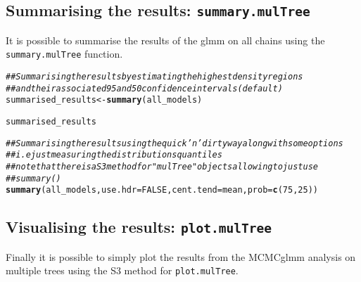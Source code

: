 \documentclass{article}\usepackage[]{graphicx}\usepackage[]{color}
\makeatletter
\newcommand{\hlnum}[1]{\textcolor[rgb]{0.686,0.059,0.569}{#1}}%
\newcommand{\hlcom}[1]{\textcolor[rgb]{0.678,0.584,0.686}{\textit{#1}}}%
\newcommand{\hlstd}[1]{\textcolor[rgb]{0.345,0.345,0.345}{#1}}%
\newcommand{\hlkwb}[1]{\textcolor[rgb]{0.69,0.353,0.396}{#1}}%
\newcommand{\hlkwc}[1]{\textcolor[rgb]{0.333,0.667,0.333}{#1}}%
\newcommand{\hlkwd}[1]{\textcolor[rgb]{0.737,0.353,0.396}{\textbf{#1}}}%
\newenvironment{kframe}{%
 \def\at@end@of@kframe{}%
 \ifinner\ifhmode%
  \def\at@end@of@kframe{\end{minipage}}%
  \begin{minipage}{\columnwidth}%
 \fi\fi%
 \def\FrameCommand##1{\hskip\@totalleftmargin \hskip-\fboxsep
 \colorbox{shadecolor}{##1}\hskip-\fboxsep
     \hskip-\linewidth \hskip-\@totalleftmargin \hskip\columnwidth}%
 \MakeFramed {\advance\hsize-\width
   \@totalleftmargin\z@ \linewidth\hsize
   \@setminipage}}%
 {\par\unskip\endMakeFramed%
 \at@end@of@kframe}
\newenvironment{knitrout}{}{} %
\makeatother
\begin{document}
\subsection{Summarising the results: \texttt{summary.mulTree}}
It is possible to summarise the results of the glmm on all chains using the \texttt{summary.mulTree} function.

\begin{knitrout}
\color{fgcolor}\begin{kframe}
\begin{alltt}
\hlcom{## Summarising the results by estimating the highest density regions}
\hlcom{## and their associated 95 and 50 confidence intervals (default)}
\hlstd{summarised_results} \hlkwb{<-} \hlkwd{summary}\hlstd{(all_models)}
\end{alltt}


{\ttfamily\noindent\bfseries\color{errorcolor}{\#\# Error in summary(all\_models): error in evaluating the argument 'object' in selecting a method for function 'summary': Error: object 'all\_models' not found}}\begin{alltt}
\hlstd{summarised_results}
\end{alltt}


{\ttfamily\noindent\bfseries\color{errorcolor}{\#\# Error in eval(expr, envir, enclos): object 'summarised\_results' not found}}\begin{alltt}
\hlcom{## Summarising the results using the quick 'n' dirty way along with some options}
\hlcom{## i.e just measuring the distributions quantiles}
\hlcom{## note that there is a S3 method for "mulTree" objects allowing to just use}
\hlcom{## summary()}
\hlkwd{summary}\hlstd{(all_models,} \hlkwc{use.hdr} \hlstd{=} \hlnum{FALSE}\hlstd{,} \hlkwc{cent.tend} \hlstd{= mean,} \hlkwc{prob} \hlstd{=} \hlkwd{c}\hlstd{(}\hlnum{75}\hlstd{,} \hlnum{25}\hlstd{))}
\end{alltt}


{\ttfamily\noindent\bfseries\color{errorcolor}{\#\# Error in summary(all\_models, use.hdr = FALSE, cent.tend = mean, prob = c(75, : error in evaluating the argument 'object' in selecting a method for function 'summary': Error: object 'all\_models' not found}}\end{kframe}
\end{knitrout}

\subsection{Visualising the results: \texttt{plot.mulTree}}
Finally it is possible to simply plot the results from the MCMCglmm analysis on multiple trees using the S3 method for \texttt{plot.mulTree}.
\end{document}
